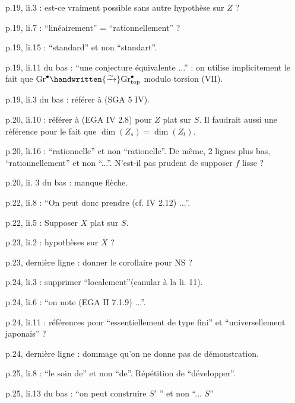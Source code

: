 p.19, li.3 : est-ce vraiment possible sans autre hypothèse sur $Z$ ?

p.19, li.7 : ``linéairement'' = ``rationnellement'' ?

p.19, li.15 : ``standard'' et non ``standart''.

p.19, li.11 du bas : ``une conjecture équivalente ...'' : on utilise implicitement le fait que $\mathrm{Gr}^{\bullet}\handwritten{\xrightarrow{\sim}}\mathrm{Gr}^{\bullet}_{\mathrm{top}}$ modulo torsion (VII\hspace{2em}).

p.19, li.3 du bas : référer à (SGA 5 IV\hspace{2em}).

p.20, li.10 : référer à (EGA IV 2.8) pour $Z$ plat sur $S$. Il faudrait aussi une référence pour le fait que $\dim(Z_s) = \dim(Z_t)$.

p.20, li.16 : ``rationnelle'' et non ``rationelle''. De même, 2 lignes plus bas, ``rationnellement'' et non ``...''. N'est-il pas prudent de supposer $f$ lisse ?

p.20, li. 3 du bas : manque flèche.

p.22, li.8 : ``On peut donc prendre (cf. IV 2.12) ...''.

p.22, li.5 : Supposer $X$ plat sur $S$.

p.23, li.2 : hypothèses sur $X$ ?

p.23, dernière ligne : donner le corollaire pour $\mathrm{NS}$ ?

\margin{\handwritten{---}}
p.24, li.3 : supprimer ``localement''(canular à la li. 11).

p.24, li.6 : ``on note (EGA II 7.1.9) ...''.

p.24, li.11 : références pour ``essentiellement de type fini'' et \unsure{:} ``universellement japonais'' ?

p.24, dernière ligne : dommage qu'on ne donne pas de démonstration.

p.25, li.8 : ``le soin de'' et non ``de''. Répétition  de ``développer''.

p.25, li.13 du bas : ``on peut construire $S'$ '' et non ``... $S$''

